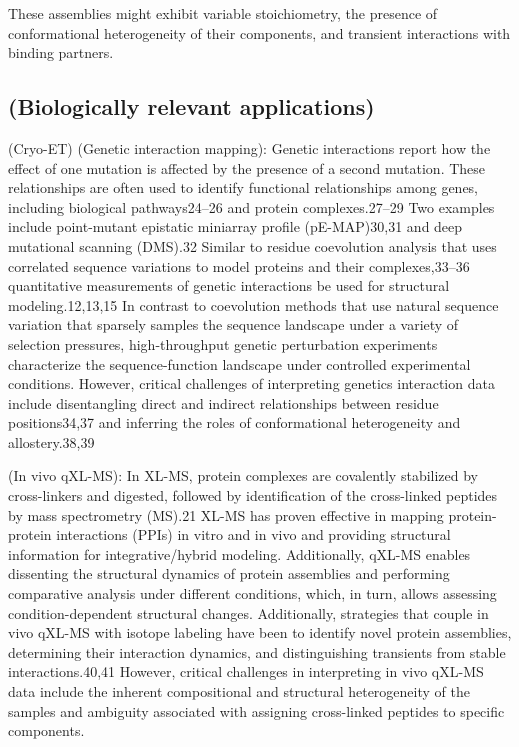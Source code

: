 \documentclass[journal=jcim,manuscript=article]{achemso}
\begin{document}
These assemblies might exhibit variable stoichiometry, the presence of conformational heterogeneity of their components, and transient interactions with binding partners. 

\subsection{(Biologically relevant applications)}

(Cryo-ET)
(Genetic interaction mapping): Genetic interactions report how the effect of one mutation is affected by the presence of a second mutation. These relationships are often used to identify functional relationships among genes, including biological pathways24–26 and protein complexes.27–29 Two examples include point-mutant epistatic miniarray profile (pE-MAP)30,31 and deep mutational scanning (DMS).32 Similar to residue coevolution analysis that uses correlated sequence variations to model proteins and their complexes,33–36 quantitative measurements of genetic interactions be used for structural modeling.12,13,15 In contrast to coevolution methods that use natural sequence variation that sparsely samples the sequence landscape under a variety of selection pressures, high-throughput genetic perturbation experiments characterize the sequence-function landscape under controlled experimental conditions. However, critical challenges of interpreting genetics interaction data include disentangling direct and indirect relationships between residue positions34,37 and inferring the roles of conformational heterogeneity and allostery.38,39 

(In vivo qXL-MS): In XL-MS, protein complexes are covalently stabilized by cross-linkers and digested, followed by identification of the cross-linked peptides by mass spectrometry (MS).21 XL-MS has proven effective in mapping protein-protein interactions (PPIs) in vitro and in vivo and providing structural information for integrative/hybrid modeling. Additionally, qXL-MS enables dissenting the structural dynamics of protein assemblies and performing comparative analysis under different conditions, which, in turn, allows assessing condition-dependent structural changes. Additionally, strategies that couple in vivo qXL-MS with isotope labeling have been to identify novel protein assemblies, determining their interaction dynamics, and distinguishing transients from stable interactions.40,41 However, critical challenges in interpreting in vivo qXL-MS data include the inherent compositional and structural heterogeneity of the samples and ambiguity associated with assigning cross-linked peptides to specific components.
\end{document}
